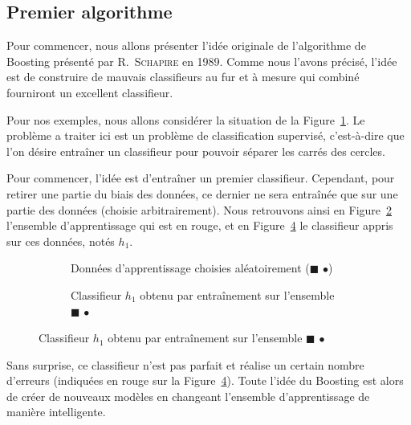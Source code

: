 \subsection{Premier algorithme}
\label{sec:boosting}
Pour commencer, nous allons présenter l'idée originale de l'algorithme de Boosting présenté par R.~\textsc{Schapire} en 1989. Comme nous l'avons précisé, l'idée est de construire de \og mauvais\fg{} classifieurs au fur et à mesure qui combiné fourniront un excellent classifieur.

Pour nos exemples, nous allons considérer la situation de la Figure~\ref{fig:boosting_situation}. Le problème a traiter ici est un problème de classification supervisé, c'est-à-dire que l'on désire entraîner un classifieur pour pouvoir séparer les carrés des cercles.

\begin{figure}[h]
	\centering
	
	\label{fig:boosting_situation}
\end{figure}

Pour commencer, l'idée est d'entraîner un premier classifieur. Cependant, pour retirer une partie du biais des données, ce dernier ne sera entraînée que sur une partie des données (choisie arbitrairement). Nous retrouvons ainsi en Figure~\ref{fig:boosting_un_app} l'ensemble d'apprentissage qui est en rouge, et en Figure~\ref{fig:boosting_un_modele} le classifieur appris sur ces données, notés $h_1$.

\begin{figure}[h]
	\begin{subfigure}{.45\textwidth}
		
		\caption{Données d'apprentissage choisies aléatoirement ($\blacksquare$ \large{$\bullet$})}
		\label{fig:boosting_un_app}
	\end{subfigure}\hfill
	\begin{subfigure}{.45\textwidth}
		
		\caption{Classifieur $h_1$ obtenu par entraînement sur l'ensemble $\blacksquare$ \large{$\bullet$}}
		\label{fig:boosting_un_modele}
	\end{subfigure}\hfill
\end{figure}

Sans surprise, ce classifieur n'est pas parfait et réalise un certain nombre d'erreurs (indiquées en rouge sur la Figure~\ref{fig:boosting_un_modele}). Toute l'idée du Boosting est alors de créer de nouveaux modèles en changeant l'ensemble d'apprentissage de manière \og intelligente\fg. 

